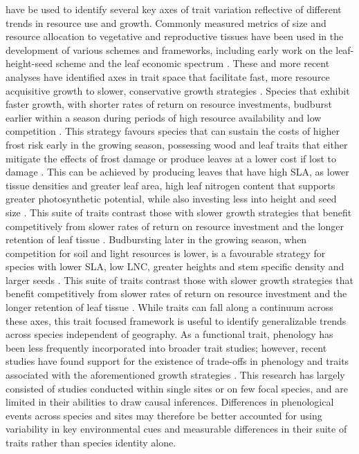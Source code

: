 \documentclass{article}\usepackage[]{graphicx}\usepackage[]{color}
\begin{document}
 have be used to identify several key axes of trait variation reflective of different trends in resource use and growth. Commonly measured metrics of size and resource allocation to vegetative and reproductive tissues have been used in the development of various schemes and frameworks, including early work on the leaf-height-seed scheme and the leaf economic spectrum \citep{Westoby1998, Wright2004}. These and more recent analyses have identified axes in trait space that facilitate fast, more resource acquisitive growth to slower, conservative growth strategies \citep{citation}. Species that exhibit faster growth, with shorter rates of return on resource investments, budburst earlier within a season during periods of high resource availability and low competition \citep{citation}. This strategy favours species that can sustain the costs of higher frost risk early in the growing season, possessing wood and leaf traits that either mitigate the effects of frost damage or produce leaves at a lower cost if lost to damage \citep{citation}. This can be achieved by producing leaves that have high SLA, as lower tissue densities and greater leaf area, high leaf nitrogen content that supports greater photosynthetic potential, while also investing less into height and seed size \citep{citation}. This suite of traits contrast those with slower growth strategies that benefit competitively from slower rates of return on resource investment and the longer retention of leaf tissue \citep{citation}. Budbursting later in the growing season, when competition for soil and light resources is lower, is a favourable strategy for species with lower SLA, low LNC, greater heights and stem specific density and larger seeds \citep{citation}. This suite of traits contrast those with slower growth strategies that benefit competitively from slower rates of return on resource investment and the longer retention of leaf tissue \citep{citation}. While traits can fall along a continuum across these axes, this trait focused framework is useful to identify generalizable trends across species independent of geography. As a functional trait, phenology has been less frequently incorporated into broader trait studies; however, recent studies have found support for the existence of trade-offs in phenology and traits associated with the aforementioned growth strategies \citep{citations from Kelly's review}. This research has largely consisted of studies conducted within single sites or on few focal species, and are limited in their abilities to draw causal inferences. Differences in phenological events across species and sites may therefore be better accounted for using variability in key environmental cues and measurable differences in their suite of traits rather than species identity alone. 
 
\end{document}
